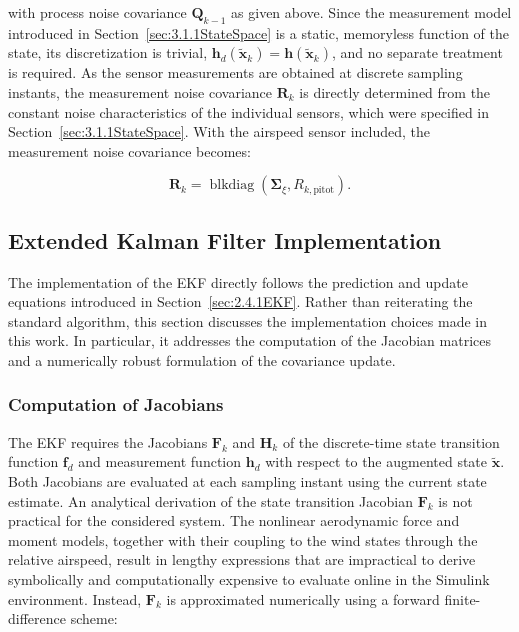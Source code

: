 with process noise covariance $\bm{Q}_{k-1}$ as given above. Since the measurement model introduced in Section~\ref{sec:3.1.1StateSpace} is a static, memoryless function of the state, its discretization is trivial, $\bm{h}_d(\tilde{\bm{x}}_k) = \bm{h}(\tilde{\bm{x}}_k)$, and no separate treatment is required.
As the sensor measurements are obtained at discrete sampling instants, the measurement noise covariance $\bm{R}_k$ is directly determined from the constant noise characteristics of the individual sensors, which were specified in Section~\ref{sec:3.1.1StateSpace}. With the airspeed sensor included, the measurement noise covariance becomes:

\begin{equation}
	\bm{R}_k 
	= 
	\operatorname{blkdiag}
	\left( \bm{\Sigma}_\xi, R_{k, \mathrm{pitot}} \right).
\end{equation}





\subsection{Extended Kalman Filter Implementation}
\label{sec:3.1.5EKFImplementation}

The implementation of the EKF directly follows the prediction and update equations introduced in Section~\ref{sec:2.4.1EKF}. Rather than reiterating the standard algorithm, this section discusses the implementation choices made in this work. In particular, it addresses the computation of the Jacobian matrices and a numerically robust formulation of the covariance update.





\subsubsection{Computation of Jacobians}

The EKF requires the Jacobians $\bm{F}_k$ and $\bm{H}_k$ of the discrete-time state transition function $\bm{f}_d$ and measurement function $\bm{h}_d$ with respect to the augmented state $\tilde{\bm{x}}$. Both Jacobians are evaluated at each sampling instant using the current state estimate. An analytical derivation of the state transition Jacobian $\bm{F}_k$ is not practical for the considered system. The nonlinear aerodynamic force and moment models, together with their coupling to the wind states through the relative airspeed, result in lengthy expressions that are impractical to derive symbolically and computationally expensive to evaluate online in the Simulink environment. Instead, $\bm{F}_k$ is approximated numerically using a forward finite-difference scheme:

